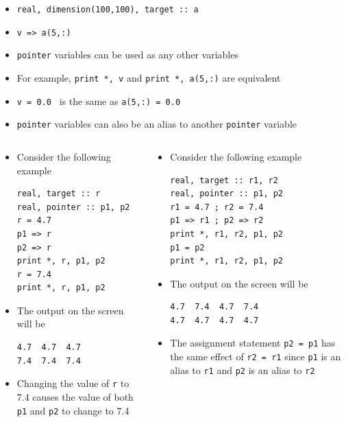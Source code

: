 \documentclass[c,mathserif,compress,xcolor=svgnames]{beamer}
\newcommand{\lstfortran}[1]{\lstinline[language={[90]Fortran},basicstyle=\footnotesize\ttfamily]|#1|}
\newenvironment{bblock}[0]
{
\begin{beamerboxesrounded}[upper=uppercol1,lower=lowercol1,shadow=true]}
{\end{beamerboxesrounded}}
\begin{document}
\begin{frame}
\begin{itemize}
    \item[] \lstfortran{real, dimension(100,100), target :: a}
    \item[] \lstfortran{v => a(5,:)}
    \item \lstfortran{pointer} variables can be used as any other variables
    \item[] For example, \lstfortran{print *, v} and \lstfortran{print *, a(5,:)} are equivalent
    \item[] \lstfortran{v = 0.0 } is the same as \lstfortran{a(5,:) = 0.0}
    \item \lstfortran{pointer} variables can also be an alias to another \lstfortran{pointer} variable
  \end{itemize}
  \framebreak
  \begin{columns}[t]
    \column{5.5cm}
    \begin{bblock}{}
      \begin{itemize}
        \item Consider the following example
          \begin{lstlisting}[language={[90]Fortran},basicstyle=\fontsize{5}{6}\selectfont\ttfamily]
real, target :: r
real, pointer :: p1, p2
r = 4.7
p1 => r
p2 => r
print *, r, p1, p2
r = 7.4
print *, r, p1, p2
          \end{lstlisting}
        \item The output on the screen will be
          \begin{Verbatim}[fontsize=\fontsize{6}{7}\selectfont,formatcom=\color{indigo}]
4.7  4.7  4.7
7.4  7.4  7.4
          \end{Verbatim}
        \item Changing the value of \lstfortran{r} to 7.4 causes the value of both \lstfortran{p1} and \lstfortran{p2} to change to 7.4
      \end{itemize}
    \end{bblock}
    \column{5.5cm}
    \begin{bblock}{}
      \begin{itemize}
        \item Consider the following example
          \begin{lstlisting}[language={[90]Fortran},basicstyle=\fontsize{5}{6}\selectfont\ttfamily]
real, target :: r1, r2
real, pointer :: p1, p2
r1 = 4.7 ; r2 = 7.4
p1 => r1 ; p2 => r2
print *, r1, r2, p1, p2
p1 = p2
print *, r1, r2, p1, p2
          \end{lstlisting}
        \item The output on the screen will be
          \begin{Verbatim}[fontsize=\fontsize{6}{7}\selectfont,formatcom=\color{indigo}]
4.7  7.4  4.7  7.4
4.7  4.7  4.7  4.7
          \end{Verbatim}
        \item The assignment statement \lstfortran{p2 = p1} has the same effect of \lstfortran{r2 = r1} since \lstfortran{p1} is an alias to \lstfortran{r1} and \lstfortran{p2} is an alias to \lstfortran{r2}
      \end{itemize}
    \end{bblock}
  \end{columns}


\end{frame}
\end{document}

